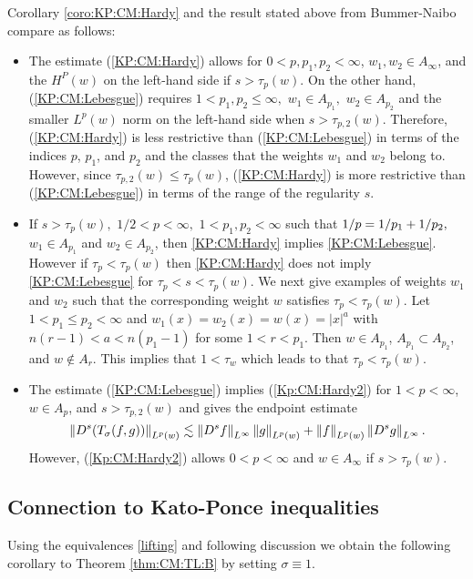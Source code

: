 {Corollary \ref{coro:KP:CM:Hardy} and the result stated above from Bummer-Naibo compare as follows: 

\begin{itemize}
\item The estimate (\ref{KP:CM:Hardy}) allows for $0<p,p_1,p_2 < \infty$, $w_1,w_2 \in A_\infty$, and the $H^P(w)$ on the left-hand side if $s>\tau_p(w)$. On the other hand, (\ref{KP:CM:Lebesgue}) requires $1<p_1,p_2\le \infty,$ $w_1\in A_{p_1},$ $w_2\in A_{p_2}$ and the smaller $L^p(w)$ norm on the left-hand side when $s>\tau_{p,2}(w)$. Therefore, (\ref{KP:CM:Hardy}) is less restrictive than (\ref{KP:CM:Lebesgue}) in terms of the indices $p$, $p_1$, and $p_2$ and the classes that the weights $w_1$ and $w_2$ belong to. However, since $\tau_{p,2}(w) \leq \tau_p(w)$, (\ref{KP:CM:Hardy}) is more restrictive than (\ref{KP:CM:Lebesgue}) in terms of the range of the regularity $s$.
\item If $s>\tau_{p}(w),$   $1/2<p<\infty,$ $1<p_1,p_2<\infty$ such that $1/p=1/p_1+1/p_2,$  $w_1\in A_{p_1}$ and $w_2\in A_{p_2}$, then \eqref{KP:CM:Hardy} implies \eqref{KP:CM:Lebesgue}. However if $\tau_p < \tau_p(w)$ then \eqref{KP:CM:Hardy} does not imply \eqref{KP:CM:Lebesgue} for $\tau_p < s < \tau_p(w)$. We next give examples of weights $w_1$ and $w_2$ such that the corresponding weight $w$ satisfies $\tau_p < \tau_p(w)$.  Let $1<p_1\leq p_2 <\infty$ and $w_1(x) = w_2(x) = w(x) = |x|^a$ with $n(r-1)<a<n(p_1-1)$ for some $1<r<p_1$. Then $w \in A_{p_1}$, $A_{p_1} \subset A_{p_2}$, and $w \notin A_r$. This implies that $1<\tau_w$ which leads to that $\tau_p < \tau_p(w)$. 
\item  The estimate (\ref{KP:CM:Lebesgue}) implies (\ref{Kp:CM:Hardy2}) for $1<p<\infty$, $w\in A_p$, and $s>\tau_{p,2}(w)$ and gives the endpoint estimate 
$$ \left\|D^s(T_\sigma(f,g))\right\|_{L^p(w)} \lesssim \left\|D^s f\right\|_{L^{\infty}} \left\|g\right\|_{L^{p}(w)} +  \left\|f\right\|_{L^{p}(w)}\left\|D^s g\right\|_{L^\infty}. $$
However, (\ref{Kp:CM:Hardy2}) allows $0<p<\infty$ and $w\in A_\infty$ if $s>\tau_p (w)$.
\end{itemize}

\subsection{Connection to Kato-Ponce inequalities}
Using the equivalences \ref{lifting} and following discussion we obtain the following corollary to Theorem \ref{thm:CM:TL:B} by setting $\sigma \equiv 1$. 

}
